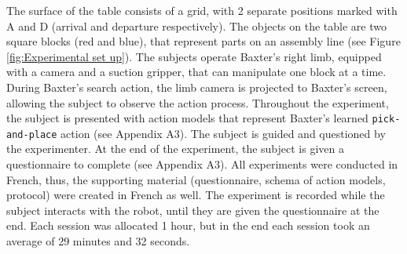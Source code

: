 The surface of the table consists of a grid, with 2 separate positions marked with A and D (arrival and departure respectively). The objects on the table are two square blocks (red and blue), that represent parts on an assembly line (see Figure \ref{fig:Experimental set up}). The subjects operate Baxter's right limb, equipped with a camera and a suction gripper, that can manipulate one block at a time. During Baxter's search action, the limb camera is projected to Baxter's screen, allowing the subject to observe the action process. Throughout the experiment, the subject is presented with action models that represent Baxter's learned \texttt{pick-and-place} action (see Appendix A3). The subject is guided and questioned by the experimenter. At the end of the experiment, the subject is given a questionnaire to complete (see Appendix A3). All experiments were conducted in French, thus, the supporting material (questionnaire, schema of action models, protocol) were created in French as well. The experiment is recorded while the subject interacts with the robot, until they are given the questionnaire at the end. Each session was allocated 1 hour, but in the end each session took an average of 29 minutes and 32 seconds.


